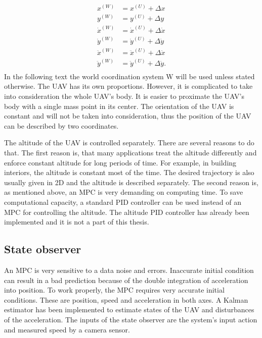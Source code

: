 \documentclass[a4paper,11pt,titlepage]{article}
\begin{document}
\begin{equation}
\label{eq:coordinate_transform}
\begin{split}
x^{(W)} &= x^{(U)}+\Delta x	\\
y^{(W)} &= y^{(U)}+\Delta y	\\
\dot{x}^{(W)} &= \dot{x}^{(U)}+\Delta \dot{x}	\\
\dot{y}^{(W)} &= \dot{y}^{(U)}+\Delta \dot{y}	\\
\ddot{x}^{(W)} &= \ddot{x}^{(U)}+\Delta \ddot{x}	\\
\ddot{y}^{(W)} &= \ddot{y}^{(U)}+\Delta \ddot{y}.	\\
\end{split}
\end{equation}
In the following text the world coordination system W will be used unless stated otherwise. The UAV has its own proportions. However, it is complicated to take into consideration the whole UAV's body. It is easier to proximate the UAV's body with a single mass point in its center. The orientation of the UAV is constant and will not be taken into consideration, thus the position of the UAV can be described by two coordinates. 

The altitude of the UAV is controlled separately. There are several reasons to do that. The first reason is, that many applications treat the altitude differently and enforce constant altitude for long periods of time. For example, in building interiors, the altitude is constant most of the time. The desired trajectory is also usually given in 2D and the altitude is described separately. The second reason is, as mentioned above, an MPC is very demanding on computing time. To save computational capacity, a standard PID controller can be used instead of an MPC for controlling the altitude. The altitude PID controller has already been implemented \cite{tomas} and it is not a part of this thesis. 

\subsection{State observer}
\label{sec:state_observer}
An MPC is very sensitive to a data noise and errors. Inaccurate initial condition can result in a bad prediction because of the double integration of acceleration into position. To work properly, the MPC requires very accurate initial conditions. These are position, speed and acceleration in both axes. A Kalman estimator has been implemented\cite{tomas} to estimate states of the UAV and disturbances of the acceleration. The inputs of the state observer are the system's input action and measured speed by a camera sensor.
\end{document}
